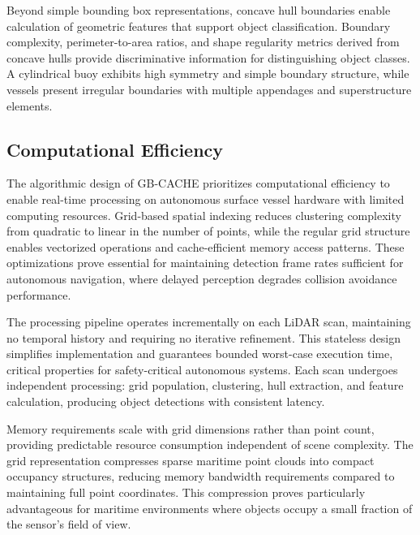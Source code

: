 \documentclass{erauthesis}
\begin{document}
Beyond simple bounding box representations, concave hull boundaries enable calculation of geometric features that support object classification.
Boundary complexity, perimeter-to-area ratios, and shape regularity metrics derived from concave hulls provide discriminative information for distinguishing object classes.
A cylindrical buoy exhibits high symmetry and simple boundary structure, while vessels present irregular boundaries with multiple appendages and superstructure elements.

\subsection{Computational Efficiency} \label{sec:gbcache_efficiency}

The algorithmic design of \ac{GB-CACHE} prioritizes computational efficiency to enable real-time processing on autonomous surface vessel hardware with limited computing resources.
Grid-based spatial indexing reduces clustering complexity from quadratic to linear in the number of points, while the regular grid structure enables vectorized operations and cache-efficient memory access patterns.
These optimizations prove essential for maintaining detection frame rates sufficient for autonomous navigation, where delayed perception degrades collision avoidance performance.

The processing pipeline operates incrementally on each \ac{LiDAR} scan, maintaining no temporal history and requiring no iterative refinement.
This stateless design simplifies implementation and guarantees bounded worst-case execution time, critical properties for safety-critical autonomous systems.
Each scan undergoes independent processing: grid population, clustering, hull extraction, and feature calculation, producing object detections with consistent latency.

Memory requirements scale with grid dimensions rather than point count, providing predictable resource consumption independent of scene complexity.
The grid representation compresses sparse maritime point clouds into compact occupancy structures, reducing memory bandwidth requirements compared to maintaining full point coordinates.
This compression proves particularly advantageous for maritime environments where objects occupy a small fraction of the sensor's field of view.
\end{document}
